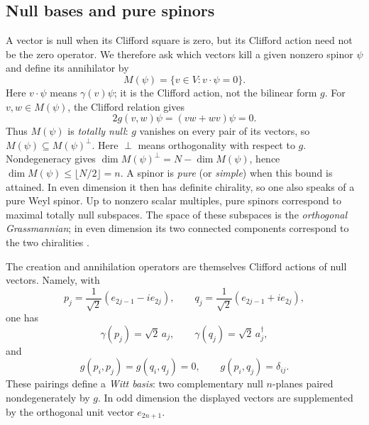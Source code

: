 \documentclass{article}
\theoremstyle{definition}
\theoremstyle{remark}
\begin{document}
\subsection{Null bases and pure spinors}
\label{sec:null-bases-pure-spinors}
A vector is null when its Clifford square is zero, but its Clifford
action need not be the zero operator. We therefore ask which vectors
kill a given nonzero spinor $\psi$ and define its annihilator by
\begin{equation}
 M(\psi)=\{v\in V:v\cdot\psi=0\}.
 \label{eq:annihilator}
\end{equation}
Here $v\cdot\psi$ means $\gamma(v)\psi$; it is the Clifford action,
not the bilinear form $g$. For $v,w\in M(\psi)$, the Clifford relation gives
\begin{equation}
     2g(v,w)\psi=(vw+wv)\psi=0.
\end{equation}
Thus $M(\psi)$ is \emph{totally null}: $g$ vanishes on every pair of
its vectors, so $M(\psi)\subseteq M(\psi)^\perp$. Here $\perp$ means
orthogonality with respect to $g$. Nondegeneracy gives
$\dim M(\psi)^\perp=N-\dim M(\psi)$, hence
$\dim M(\psi)\le\lfloor N/2\rfloor=n$.
A spinor is \emph{pure} (or \emph{simple}) when this bound is attained.
In even dimension it then has definite chirality, so one also speaks of
a pure Weyl spinor. Up to nonzero scalar multiples, pure spinors
correspond to maximal totally null subspaces. The space of these
subspaces is the \emph{orthogonal Grassmannian}; in even dimension its
two connected components correspond to the two chiralities
\cite{Trautman_Budinich,TrautmanTrautman}.

The creation and annihilation operators are themselves Clifford actions of
null vectors.  Namely, with
\begin{equation*}
 p_j=\frac1{\sqrt2}(e_{2j-1}-ie_{2j}),
 \qquad
 q_j=\frac1{\sqrt2}(e_{2j-1}+ie_{2j}),
\end{equation*}
one has
\begin{equation*}
 \gamma(p_j)=\sqrt2\,a_j,\qquad
 \gamma(q_j)=\sqrt2\,a_j^\dagger,
\end{equation*}
and
\begin{equation}
   g(p_i,p_j)=g(q_i,q_j)=0, \qquad g(p_i,q_j)=\delta_{ij}.
\end{equation}
These pairings define a \emph{Witt basis}: two complementary null
$n$-planes paired nondegenerately by $g$. In odd dimension the displayed
vectors are supplemented by the orthogonal unit vector $e_{2n+1}$.
\end{document}
